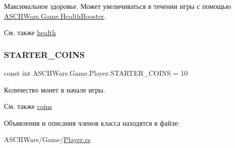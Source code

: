 Максимальное здоровье. Может увеличиваться в течении игры с помощью \hyperlink{class_a_s_c_i_i_wars_1_1_game_1_1_health_booster}{A\+S\+C\+I\+I\+Wars.\+Game.\+Health\+Booster}. 

\begin{DoxySeeAlso}{См. также}
\hyperlink{class_a_s_c_i_i_wars_1_1_game_1_1_player_a8f364a47ef452b6c99bc13b7bdaae7ca}{health} 
\end{DoxySeeAlso}
\hypertarget{class_a_s_c_i_i_wars_1_1_game_1_1_player_af33b6af0d723918290a4a38aa4a6fb66}{}\label{class_a_s_c_i_i_wars_1_1_game_1_1_player_af33b6af0d723918290a4a38aa4a6fb66} 
\subsubsection{\texorpdfstring{S\+T\+A\+R\+T\+E\+R\+\_\+\+C\+O\+I\+NS}{STARTER\_COINS}}
{\footnotesize\ttfamily const int A\+S\+C\+I\+I\+Wars.\+Game.\+Player.\+S\+T\+A\+R\+T\+E\+R\+\_\+\+C\+O\+I\+NS = 10\hspace{0.3cm}{\ttfamily [private]}}



Количество монет в начале игры. 

\begin{DoxySeeAlso}{См. также}
\hyperlink{class_a_s_c_i_i_wars_1_1_game_1_1_player_a5abede19c5428143df924357ad475691}{coins} 
\end{DoxySeeAlso}


Объявления и описания членов класса находятся в файле\+:\begin{DoxyCompactItemize}
\item 
A\+S\+C\+I\+I\+Wars/\+Game/\hyperlink{_player_8cs}{Player.\+cs}\end{DoxyCompactItemize}
